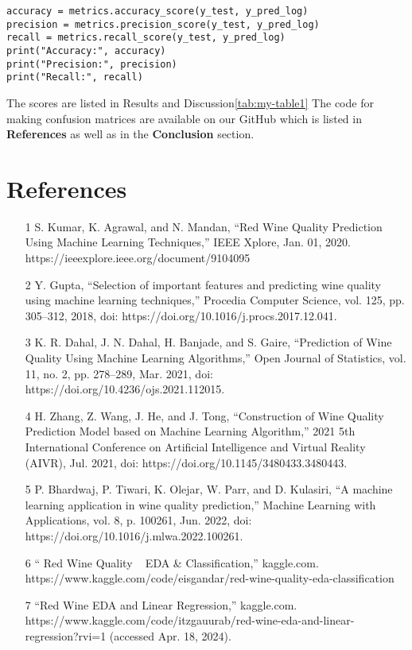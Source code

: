 \documentclass{article}
\begin{document}
\begin{lstlisting}
accuracy = metrics.accuracy_score(y_test, y_pred_log)
precision = metrics.precision_score(y_test, y_pred_log)
recall = metrics.recall_score(y_test, y_pred_log)
print("Accuracy:", accuracy)
print("Precision:", precision)
print("Recall:", recall)

\end{lstlisting}
The scores are listed in Results and Discussion\ref{tab:my-table1}
The code for making confusion matrices are available on our GitHub which is listed in \textbf{References} as well as in the \textbf{Conclusion} section.
\newline
\newline
\section*{References}
\begin{itemize}
\item [1] S. Kumar, K. Agrawal, and N. Mandan, “Red Wine Quality Prediction Using Machine Learning Techniques,” IEEE Xplore, Jan. 01, 2020. https://ieeexplore.ieee.org/document/9104095

\item [2]Y. Gupta, “Selection of important features and predicting wine quality using machine learning techniques,” Procedia Computer Science, vol. 125, pp. 305–312, 2018, doi: https://doi.org/10.1016/j.procs.2017.12.041.

\item [3]K. R. Dahal, J. N. Dahal, H. Banjade, and S. Gaire, “Prediction of Wine Quality Using Machine Learning Algorithms,” Open Journal of Statistics, vol. 11, no. 2, pp. 278–289, Mar. 2021, doi: https://doi.org/10.4236/ojs.2021.112015.
‌
\item [4]H. Zhang, Z. Wang, J. He, and J. Tong, “Construction of Wine Quality Prediction Model based on Machine Learning Algorithm,” 2021 5th International Conference on Artificial Intelligence and Virtual Reality (AIVR), Jul. 2021, doi: https://doi.org/10.1145/3480433.3480443.
‌
\item [5]P. Bhardwaj, P. Tiwari, K. Olejar, W. Parr, and D. Kulasiri, “A machine learning application in wine quality prediction,” Machine Learning with Applications, vol. 8, p. 100261, Jun. 2022, doi: https://doi.org/10.1016/j.mlwa.2022.100261.

\item [6]“ Red Wine Quality ~ EDA & Classification,” kaggle.com. https://www.kaggle.com/code/eisgandar/red-wine-quality-eda-classification
‌
\item [7]“Red Wine EDA and Linear Regression,” kaggle.com. https://www.kaggle.com/code/itzgauurab/red-wine-eda-and-linear-regression?rvi=1 (accessed Apr. 18, 2024).
‌\end{itemize}
\end{document}

